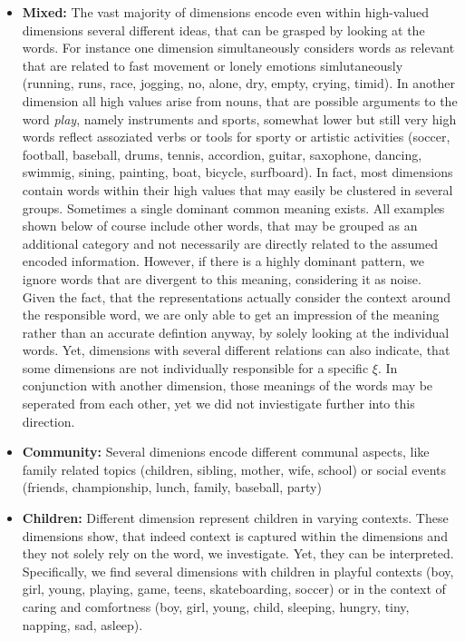 \begin{itemize}
\item \textbf{Mixed:} The vast majority of dimensions encode even within high-valued dimensions several different ideas, that can be grasped by looking at the words. For instance one dimension simultaneously considers words as relevant that are related to fast movement or lonely emotions simlutaneously (running, runs, race, jogging, no, alone, dry, empty, crying, timid). In another dimension all high values arise from nouns, that are possible arguments to the word \textit{play}, namely instruments and sports, somewhat lower but still very high words reflect assoziated verbs or tools for sporty or artistic activities (soccer, football, baseball, drums, tennis, accordion, guitar, saxophone, dancing, swimmig, sining, painting, boat, bicycle, surfboard). In fact, most dimensions contain words within their high values that may easily be clustered in several groups. Sometimes a single dominant common meaning exists. All examples shown below of course include other words, that may be grouped as an additional category and not necessarily are directly related to the assumed encoded information. However, if there is a highly dominant pattern, we ignore words that are divergent to this meaning, considering it as noise. Given the fact, that the representations actually consider the context around the responsible word, we are only able to get an impression of the meaning rather than an accurate defintion anyway, by solely looking at the individual words. Yet, dimensions with several different relations can also indicate, that some dimensions are not individually responsible for a specific $\xi$. In conjunction with another dimension, those meanings of the words may be seperated from each other, yet we did not inviestigate further into this direction.
\item \textbf{Community:} Several dimenions encode different communal aspects, like family related topics (children, sibling, mother, wife, school) or social events (friends, championship, lunch, family, baseball, party)
\item \textbf{Children:} Different dimension represent children in varying contexts. These dimensions show, that indeed context is captured within the dimensions and they not solely rely on the word, we investigate. Yet, they can be interpreted. Specifically, we find several dimensions with children in playful contexts (boy, girl, young, playing, game, teens, skateboarding, soccer) or in the context of caring and comfortness (boy, girl, young, child, sleeping, hungry, tiny, napping, sad, asleep).

\end{itemize}
